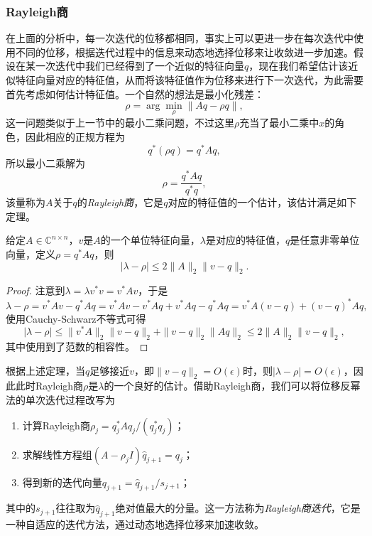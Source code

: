 \documentclass[a4paper,10pt]{ctexart}
\begin{document}
\subsubsection{Rayleigh商}
在上面的分析中，每一次迭代的位移都相同，事实上可以更进一步在每次迭代中使用不同的位移，根据迭代过程中的信息来动态地选择位移来让收敛进一步加速。假设在某一次迭代中我们已经得到了一个近似的特征向量$ q $，现在我们希望估计该近似特征向量对应的特征值，从而将该特征值作为位移来进行下一次迭代，为此需要首先考虑如何估计特征值。一个自然的想法是最小化残差：
\begin{equation}
    \rho = \arg \min_{\rho} \| Aq - \rho q \|,
\end{equation}
这一问题类似于上一节中的最小二乘问题，不过这里$ \rho $充当了最小二乘中$ x $的角色，因此相应的正规方程为
\begin{equation}
    q^*(\rho  q) = q^* A q,
\end{equation}
所以最小二乘解为
\begin{equation}
    \rho = \frac{q^* A q}{q^* q},
\end{equation}
该量称为$ A $关于$ q $的\emph{Rayleigh商}，它是$ q $对应的特征值的一个估计，该估计满足如下定理。
\begin{theorem}
    给定$ A\in \mathbb{C}^{n\times n} $，$ v $是$ A $的一个单位特征向量，$ \lambda $是对应的特征值，$ q $是任意非零单位向量，定义$ \rho = q^* A q $，则
    \begin{equation}
        |\lambda - \rho|\leqslant 2\| A \|_2 \| v-q \|_2.
    \end{equation}
\end{theorem}
\begin{proof}
    注意到$ \lambda = \lambda v^*v = v^* A v $，于是
    \[
        \lambda - \rho = v^* A v - q^* A q = v^* A v - v^* A q + v^* A q - q^* A q = v^* A (v-q) + (v-q)^* A q,
    \]
    使用Cauchy-Schwarz不等式可得
    \[
        |\lambda - \rho| \leqslant \| v^* A \|_2 \| v-q \|_2 + \| v-q \|_2 \| A q \|_2 \leqslant 2\| A \|_2 \| v-q \|_2,
    \]
    其中使用到了范数的相容性。
\end{proof}
根据上述定理，当$ q $足够接近$ v $，即$ \| v-q \|_2 = O(\epsilon) $时，则$ |\lambda - \rho| = O(\epsilon) $，因此此时Rayleigh商$ \rho $是$ \lambda $的一个良好的估计。借助Rayleigh商，我们可以将位移反幂法的单次迭代过程改写为
\begin{enumerate}
    \item 计算Rayleigh商$ \rho_j = q_j^* A q_j / (q_j^* q_j) $；
    \item 求解线性方程组$ (A-\rho_j I)\hat{q}_{j+1} = q_j $；
    \item 得到新的迭代向量$ q_{j+1} = \hat{q}_{j+1} / s_{j+1} $；
\end{enumerate}
其中的$ s_{j+1} $往往取为$ \hat{q}_{j+1} $绝对值最大的分量。这一方法称为\emph{Rayleigh商迭代}，它是一种自适应的迭代方法，通过动态地选择位移来加速收敛。
\end{document}
